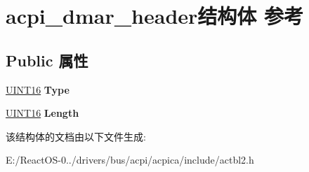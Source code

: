 \hypertarget{structacpi__dmar__header}{}\section{acpi\+\_\+dmar\+\_\+header结构体 参考}
\label{structacpi__dmar__header}
\subsection*{Public 属性}
\begin{DoxyCompactItemize}
\item 
\mbox{\label{structacpi__dmar__header_aea7c372cca839728693a9bc9deee868f}} 
\hyperlink{_processor_bind_8h_a09f1a1fb2293e33483cc8d44aefb1eb1}{U\+I\+N\+T16} {\bfseries Type}
\item 
\mbox{\label{structacpi__dmar__header_a8559ed8c7a8c3b57bc4e2cdd7f3d6ef1}} 
\hyperlink{_processor_bind_8h_a09f1a1fb2293e33483cc8d44aefb1eb1}{U\+I\+N\+T16} {\bfseries Length}
\end{DoxyCompactItemize}


该结构体的文档由以下文件生成\+:\begin{DoxyCompactItemize}
\item 
E\+:/\+React\+O\+S-\/0../drivers/bus/acpi/acpica/include/actbl2.\+h\end{DoxyCompactItemize}
